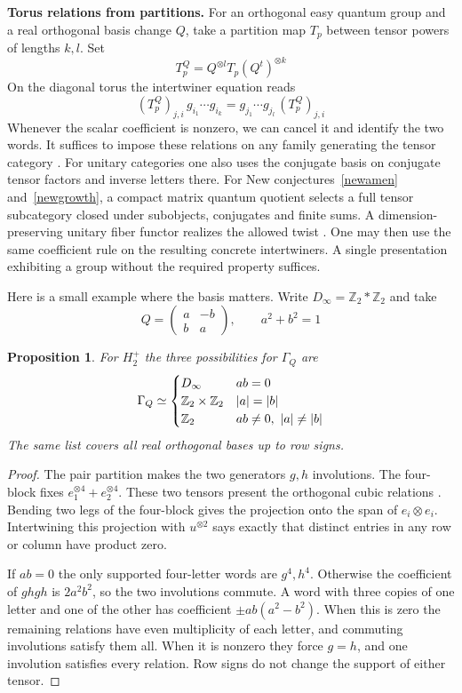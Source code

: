 \documentclass[11pt,a4paper]{article}
\newtheorem{prop}[thm]{Proposition}
\theoremstyle{remark}
\newcommand{\topic}[1]{\par\addvspace{1.0\baselineskip}\noindent\textbf{#1.}\enspace\ignorespaces}
\begin{document}
\topic{Torus relations from partitions}
For an orthogonal easy quantum group and a real orthogonal basis
change $Q$, take a partition map $T_p$ between tensor powers of
lengths $k,l$. Set
\[
 T_p^Q=Q^{\otimes l}T_p(Q^t)^{\otimes k}
\]
On the diagonal torus the intertwiner equation reads
\[
 (T_p^Q)_{j,i}\,g_{i_1}\cdots g_{i_k}
 =g_{j_1}\cdots g_{j_l}\,(T_p^Q)_{j,i}
\]
Whenever the scalar coefficient is nonzero, we can cancel it and identify
the two words. It suffices to impose these relations on any family
generating the tensor category
\cite[Section~6]{bp}. For unitary categories one also uses the conjugate
basis on conjugate tensor factors and inverse letters there. For
New conjectures~\ref{newamen} and~\ref{newgrowth}, a compact matrix
quantum quotient selects a full tensor subcategory closed under
subobjects, conjugates and finite sums. A dimension-preserving unitary
fiber functor realizes the allowed twist \cite{bdv}. One may then use the
same coefficient rule on the resulting concrete intertwiners. A single
presentation exhibiting a group without the required property suffices.

Here is a small example where the basis matters. Write $D_\infty=
\mathbb Z_2*\mathbb Z_2$ and take
\[
 Q=\begin{pmatrix}a&-b\\ b&a\end{pmatrix},\qquad a^2+b^2=1
\]
\begin{prop}\label{ranktwotori}
For $H_2^+$ the three possibilities for $\Gamma_Q$ are
\[
 \Gamma_Q\simeq
 \begin{cases}
 D_\infty & ab=0\cr
 \mathbb Z_2\times\mathbb Z_2 & |a|=|b|\cr
 \mathbb Z_2 & ab\ne0,\ |a|\ne|b|
 \end{cases}
\]
The same list covers all real orthogonal bases up to row signs.
\end{prop}
\begin{proof}
The pair partition makes the two generators $g,h$ involutions.
The four-block fixes $e_1^{\otimes4}+e_2^{\otimes4}$.
These two tensors present the orthogonal cubic relations
\cite{liberation,reflection}. Bending two legs of the four-block gives the projection onto the span of $e_i\otimes e_i$. Intertwining
this projection with $u^{\otimes2}$ says exactly that distinct entries
in any row or column have product zero.

If $ab=0$ the only supported four-letter words are $g^4,h^4$.
Otherwise the coefficient of $ghgh$ is $2a^2b^2$, so the two
involutions commute. A word with three copies of one letter and one
of the other has coefficient $\pm ab(a^2-b^2)$. When this is zero
the remaining relations have even multiplicity of each letter, and
commuting involutions satisfy them all. When it is nonzero they force
$g=h$, and one involution satisfies every relation. Row signs do
not change the support of either tensor.
\end{proof}
\end{document}
